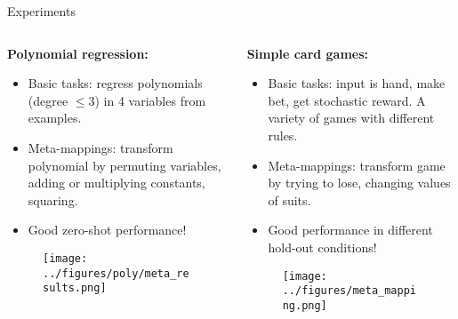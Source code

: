 \documentclass[final]{beamer}
\begin{document}
\begin{frame}[t]{}
\begin{columns}
\begin{column}[t]{0.496\textwidth}
\begin{block}{\huge Experiments}
\vspace{-0.5em}
\begin{columns}
\begin{column}[t]{0.48\textwidth}
\textbf{Polynomial regression:}
\begin{itemize}
\item Basic tasks: regress polynomials (degree \(\leq 3\)) in 4 variables from examples. 
\item Meta-mappings: transform polynomial by permuting variables, adding or multiplying constants, squaring. 
\item Good zero-shot performance!
\end{itemize}
\begin{figure}[H]
\texttt{[image: ../figures/poly/meta\_results.png]}
\end{figure}
\end{column}
\begin{column}[t]{0.48\textwidth}
\textbf{Simple card games:}
\begin{itemize}
\item Basic tasks: input is hand, make bet, get stochastic reward. A variety of games with different rules. 
\item Meta-mappings: transform game by trying to lose, changing values of suits. 
\item Good performance in different hold-out conditions!
\end{itemize}
\begin{figure}[H]
\texttt{[image: ../figures/meta\_mapping.png]}
\end{figure}
\end{column}
\end{columns}
\end{block}
\end{column}


\end{columns}
\end{frame}
\end{document}
